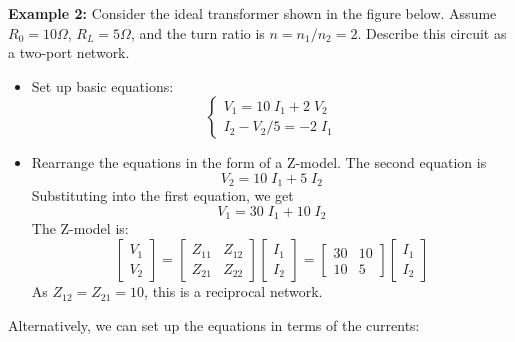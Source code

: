 {\bf Example 2:} Consider the ideal transformer shown in the figure below. 
Assume $R_0=10\Omega$, $R_L=5\Omega$, and the turn ratio is $n=n_1/n_2=2$. 
Describe this circuit as a two-port network.


\begin{itemize}
\item Set up basic equations:
\[	\left\{ \begin{array}{l} 
	V_1=10\;I_1+2\;V_2 \\ I_2-V_2/5=-2\;I_1 \end{array} \right. \]
\item Rearrange the equations in the form of a Z-model. The second equation is
\[	V_2=10\;I_1+5\;I_2	\]
Substituting into the first equation, we get
\[	V_1=30\;I_1+10\;I_2	\]
The Z-model is:
\[	\left[ \begin{array}{l} V_1 \\ V_2 \end{array} \right]=
	\left[ \begin{array}{rr} Z_{11} & Z_{12} \\ Z_{21} & Z_{22} \end{array} \right]
	\left[ \begin{array}{l} I_1 \\ I_2 \end{array} \right]
=	\left[ \begin{array}{rr} 30 & 10 \\ 10 & 5 \end{array} \right]
	\left[ \begin{array}{l} I_1 \\ I_2 \end{array} \right]
\]
As $Z_{12}=Z_{21}=10$, this is a reciprocal network.
\end{itemize}
Alternatively, we can set up the equations in terms of the currents:

